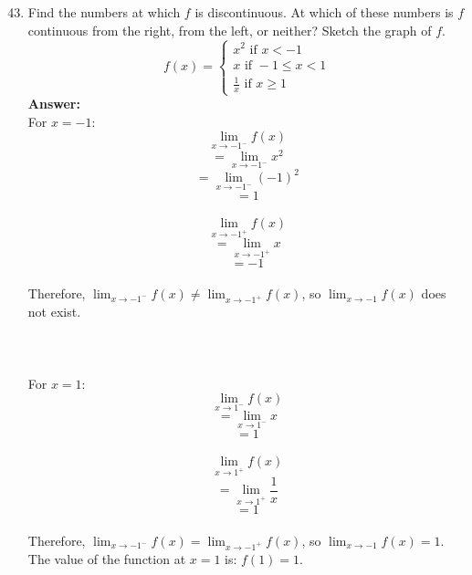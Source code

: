 \documentclass[12pt]{article}
\begin{document}
\begin{enumerate}
\setcounter{enumi}{42}
    \item Find the numbers at which $f$ is discontinuous. At which of these numbers is $f$ continuous from the right, from the left, or neither? Sketch the graph of $f$.
    \[ f(x) = \left \{ \begin{array}{l}  
     x^2 \text{ if } x < -1 \\
     x \text{ if } -1 \leqslant x < 1 \\
     {\displaystyle \frac{1}{x} \text{ if } x \geqslant 1} \end{array} \right. \]
    \textbf{Answer: }\\
    For $x = -1$:
        \[{\displaystyle \lim_{x \to -1^-} f(x)}\]
        \[ = {\displaystyle \lim_{x \to -1^-} x^2}\]
        \[ = {\displaystyle \lim_{x \to -1^-} (-1)^2}\]
        \[ = 1 \]\\
        \[{\displaystyle \lim_{x \to -1^+} f(x)}\]
        \[ = {\displaystyle \lim_{x \to -1^+} x}\]
        \[ = -1 \]\\
    Therefore, ${\displaystyle \lim_{x \to -1^-} f(x)} \neq {\displaystyle \lim_{x \to -1^+} f(x)}$, so ${\displaystyle \lim_{x \to -1} f(x)}$ does not exist.\\~\\
    \noindent{}\\~\\
    For $x = 1$:
        \[{\displaystyle \lim_{x \to 1^-} f(x)}\]
        \[ = {\displaystyle \lim_{x \to 1^-} x}\]
        \[ = 1 \]
        \\
        \[{\displaystyle \lim_{x \to 1^+} f(x)}\]
        \[ = {\displaystyle \lim_{x \to 1^+} \frac{1}{x}}\]
        \[ = 1 \]\\
    Therefore, ${\displaystyle \lim_{x \to -1^-} f(x)} = {\displaystyle \lim_{x \to -1^+} f(x)}$, so ${\displaystyle \lim_{x \to -1} f(x) = 1}$.\\
    The value of the function at $x = 1$ is: $f(1) = 1$.\\~\\
    \noindent{}
    

\end{enumerate}
\end{document}
